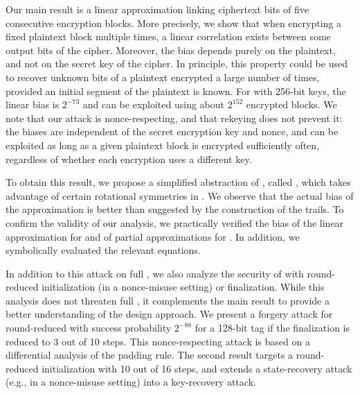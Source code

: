 Our main result is a linear approximation \cite{eurocryptMatsui93,eurocryptMatsuiY92} linking ciphertext bits of five consecutive encryption blocks.
More precisely, we show that when encrypting a fixed plaintext block multiple times, a linear correlation exists between some output bits of the cipher.
Moreover, the bias depends purely on the plaintext, and not on the secret key of the cipher.
In principle, this property could be used to recover unknown bits of a plaintext encrypted a large number of times, provided an initial segment of the plaintext is known.
For \MORUS[1280] with 256-bit keys, the linear bias is $2^{-73}$
and can be exploited using about $2^{152}$ encrypted blocks.
We note that our attack is nonce-respecting, and that rekeying does not prevent it: the biases are independent of the secret encryption key and nonce, and can be exploited as long as a given plaintext block is encrypted sufficiently often, regardless of whether each encryption uses a different key.

To obtain this result, we propose a simplified abstraction of \MORUS, called \MiniMORUS, which takes advantage of certain rotational symmetries in \MORUS.
We observe that the actual bias of the approximation is better than suggested by the construction of the trails.
To confirm the validity of our analysis,
we practically verified the bias of the linear approximation for \MiniMORUS and of partial approximations for \MORUS.
In addition, we symbolically evaluated the relevant equations.

In addition to this attack on full \MORUS, we also analyze the security of \MORUS with round-reduced initialization (in a nonce-misuse setting) or finalization.
While this analysis does not threaten full \MORUS, it complements the main result to provide a better understanding of the \MORUS design approach.
We present a forgery attack for round-reduced \MORUS[1280] with success probability $2^{-88}$ for a 128-bit tag if the finalization is reduced to 3 out of 10 steps. This nonce-respecting attack is based on a differential analysis of the padding rule.
The second result targets a round-reduced initialization with 10 out of 16 steps, and extends a state-recovery attack (e.g., in a nonce-misuse setting) into a key-recovery attack.

